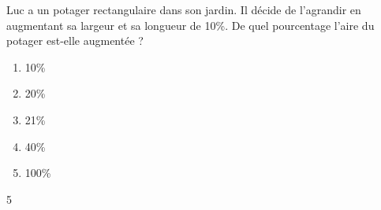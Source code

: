 Luc a un potager rectangulaire dans son jardin. Il décide de l'agrandir en augmentant sa largeur et sa longueur de 10\%. De quel pourcentage l'aire du potager est-elle augmentée ?
\begin{multicols}{5}
  \begin{enumerate}[A]
  \item 10\%
  \item 20\%
  \item 21\%
  \item 40\%
  \item 100\%
  \end{enumerate}
\end{multicols}{5}